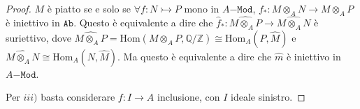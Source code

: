 \begin{proof}{}
    \(M\) è piatto se e solo se \(\forall f : N \rightarrowtail  P\) mono in
    \(A\mathtt{-Mod}\), \(f_* : M\otimes_A N \to M\otimes_A P\) è
    iniettivo in \(\mathtt{Ab}\). Questo è equivalente a dire che 
    \(\widehat{f}_* : \widehat{M \otimes_A P} \to \widehat{M \otimes_A N}\) è
    suriettivo, dove \(\widehat{M \otimes_A P} = \mathrm{Hom}{(M \otimes_A P,
    \mathbb{Q}/\mathbb{Z})} \cong \mathrm{Hom}_A{(P, \widehat{M})}\) e \(\widehat{M
\otimes_A N} \cong \mathrm{Hom}_A{(N, \widehat{M})}\). Ma questo è equivalente a
dire che \(\hat{m}\) è iniettivo in \(A\mathtt{-Mod}\).

    Per \(iii)\)  basta considerare \(f : I \to A\) inclusione, con \(I\) ideale
    sinistro.
\end{proof}

